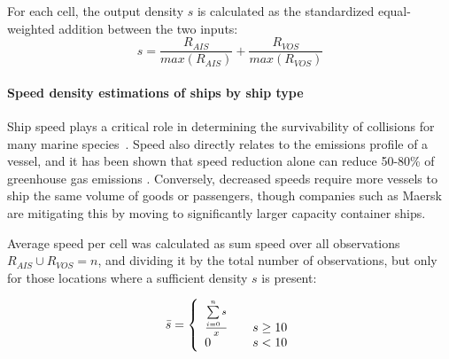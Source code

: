 For each cell, the output density $s$ is calculated as the standardized equal-weighted addition between the two inputs:
\begin{equation}
 s = \frac{R_{AIS}}{max(R_{AIS})} + \frac{R_{VOS}}{max(R_{VOS})} 
\end{equation}

\paragraph{Speed density estimations of ships by ship type}

Ship speed plays a critical role in determining the survivability of collisions for many marine species~\citep{Vanderlaan2009}. Speed also directly relates to the emissions profile of a vessel, and it has been shown that speed reduction alone can reduce 50-80\% of greenhouse gas emissions \cite{lack2011impact}. Conversely, decreased speeds require more vessels to ship the same volume of goods or passengers, though companies such as Maersk are mitigating this by moving to significantly larger capacity container ships. 

Average speed per cell was calculated as sum speed over all observations $R_{AIS} \cup R_{VOS} = n$, and dividing it by the total number of observations, but only for those locations where a sufficient density $s$ is present: 

\begin{equation}
 \bar{s} = \left\{
   \begin{array}{l l}
    \frac{\sum\limits_{i=0}^n s}{x} & \quad \text{$s \ge 10$}\\
    0 & \quad \text {$s < 10$}
   \end{array}\right.
\end{equation}




